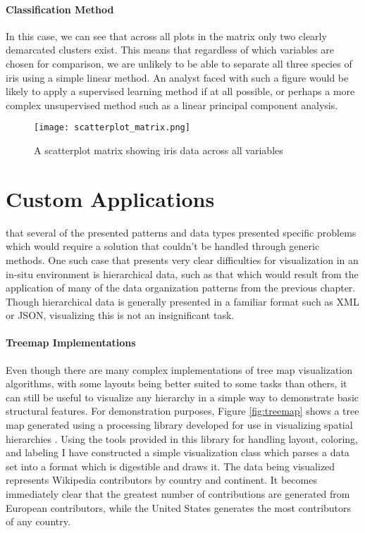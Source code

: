 \paragraph{Classification Method}
In this case, we can see that across all plots in the matrix only two clearly demarcated clusters exist. This means that regardless of which variables are chosen for comparison, we are unlikely to be able to separate all three species of iris using a simple linear method. An analyst faced with such a figure would be likely to apply a supervised learning method if at all possible, or perhaps a more complex unsupervised method such as a linear principal component analysis. 

\begin{figure}
	\centering
	\texttt{[image: scatterplot\_matrix.png]}
	\caption{A scatterplot matrix showing iris data across all variables}
	\label{fig:scatterplot_matrix}
\end{figure}

\section{Custom Applications}
 that several of the presented patterns and data types presented specific problems which would require a solution that couldn't be handled through generic methods. One such case that presents very clear difficulties for visualization in an in-situ environment is hierarchical data, such as that which would result from the application of many of the data organization patterns from the previous chapter. Though hierarchical data is generally presented  in a familiar format such as XML or JSON, visualizing this is not an insignificant task.

\paragraph{Treemap Implementations}
Even though there are many complex implementations of tree map visualization algorithms, with some layouts being better suited to some tasks than others, it can still be useful to visualize any hierarchy in a simple way to demonstrate basic structural features. For demonstration purposes, Figure \ref{fig:treemap} shows a tree map generated using a processing library developed for use in visualizing spatial hierarchies \cite{Wood2008} \cite{Slingsby2009}. Using the tools provided in this library for handling layout, coloring, and labeling I have constructed a simple visualization class which parses a data set into a format which is digestible and draws it. The data being visualized represents Wikipedia contributors by country and continent. It becomes immediately clear that the greatest number of contributions are generated from European contributors, while the United States generates the most contributors of any country. 

